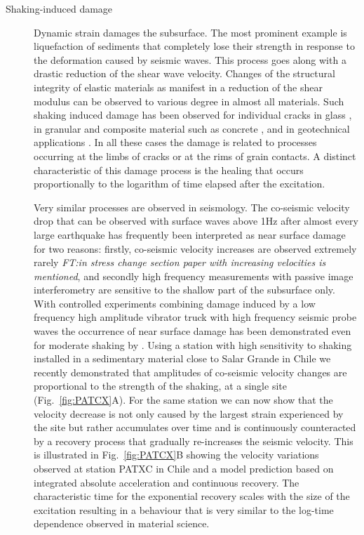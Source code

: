 \documentclass[11pt]{article}
\newcommand{\noteft}[1]{{\it \color{magenta} FT:#1}}
\newcommand{\noteft}[1]{}
\begin{document}
\begin{description}
\item[Shaking-induced damage]
Dynamic strain damages the subsurface. The most prominent example is liquefaction of sediments that completely lose their strength in response to the deformation caused by seismic waves. This process goes along with a drastic reduction of the shear wave velocity. Changes of the structural integrity of elastic materials as manifest in a reduction of the shear modulus can be observed to various degree in almost all materials. Such shaking induced damage has been observed for individual cracks in glass \citep{Zaitsev2003}, in granular \citep{Josserand2000} and composite material such as concrete \citep{TenCate2000, Tremblay2010}, and in geotechnical applications \citep{Mainsant2012a}. In all these cases the damage is related to processes occurring at the limbs of cracks or at the rims of grain contacts. A distinct characteristic of this damage process is the healing that occurs proportionally to the logarithm of time elapsed after the excitation.

Very similar processes are observed in seismology. The co-seismic velocity drop that can be observed with surface waves above 1Hz  after almost every large earthquake has frequently been interpreted as near surface damage for two reasons: firstly, co-seismic velocity increases are observed extremely rarely \noteft{in stress change section paper with increasing velocities is mentioned}, and secondly high frequency measurements with passive image interferometry are sensitive to the shallow part of the subsurface only. With controlled experiments combining damage induced by a low frequency high amplitude vibrator truck with high frequency seismic probe waves the occurrence of near surface damage has been demonstrated even for moderate shaking by \citet{Johnson2009}. Using a station with high sensitivity to shaking installed in a sedimentary material close to Salar Grande in Chile we recently demonstrated that amplitudes of co-seismic velocity changes are proportional to the strength of the shaking, at a single site \citep{Richter2014} (Fig.~\ref{fig:PATCX}A). For the same station we can now show that the velocity decrease is not only caused by the largest strain experienced by the site but rather accumulates over time and is continuously counteracted by a recovery process that gradually re-increases the seismic velocity. This is illustrated in Fig.~\ref{fig:PATCX}B  showing the velocity variations observed at station PATXC in Chile and a model prediction based on integrated absolute acceleration and continuous recovery. The characteristic time for the exponential recovery scales with the size of the excitation resulting in a behaviour that is very similar to the log-time dependence observed in material science.


\end{description}
\end{document}
